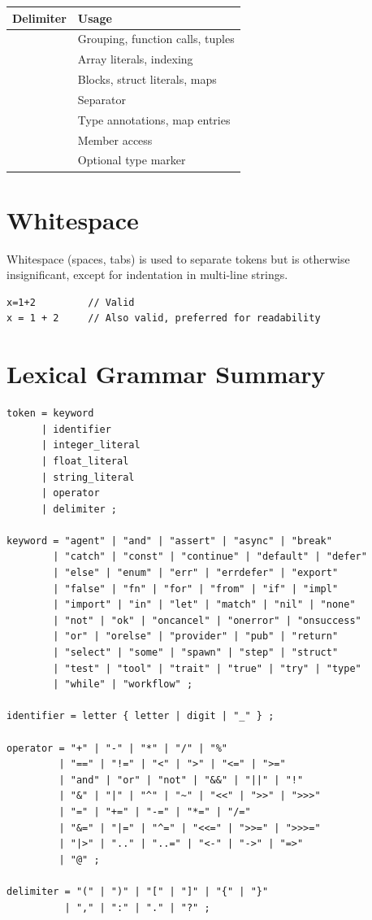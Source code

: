 \begin{table}[h]
\centering
\begin{tabular}{ll}
\toprule
\textbf{Delimiter} & \textbf{Usage} \\
\midrule
\code{(} \code{)} & Grouping, function calls, tuples \\
\code{[} \code{]} & Array literals, indexing \\
\code{\{} \code{\}} & Blocks, struct literals, maps \\
\code{,} & Separator \\
\code{:} & Type annotations, map entries \\
\code{.} & Member access \\
\code{?} & Optional type marker \\
\bottomrule
\end{tabular}
\end{table}

\section{Whitespace}

Whitespace (spaces, tabs) is used to separate tokens but is otherwise insignificant, except for indentation in multi-line strings.

\begin{lstlisting}
x=1+2         // Valid
x = 1 + 2     // Also valid, preferred for readability
\end{lstlisting}

\section{Lexical Grammar Summary}

\begin{lstlisting}[language=EBNF]
token = keyword
      | identifier
      | integer_literal
      | float_literal
      | string_literal
      | operator
      | delimiter ;

keyword = "agent" | "and" | "assert" | "async" | "break"
        | "catch" | "const" | "continue" | "default" | "defer"
        | "else" | "enum" | "err" | "errdefer" | "export"
        | "false" | "fn" | "for" | "from" | "if" | "impl"
        | "import" | "in" | "let" | "match" | "nil" | "none"
        | "not" | "ok" | "oncancel" | "onerror" | "onsuccess"
        | "or" | "orelse" | "provider" | "pub" | "return"
        | "select" | "some" | "spawn" | "step" | "struct"
        | "test" | "tool" | "trait" | "true" | "try" | "type"
        | "while" | "workflow" ;

identifier = letter { letter | digit | "_" } ;

operator = "+" | "-" | "*" | "/" | "%"
         | "==" | "!=" | "<" | ">" | "<=" | ">="
         | "and" | "or" | "not" | "&&" | "||" | "!"
         | "&" | "|" | "^" | "~" | "<<" | ">>" | ">>>"
         | "=" | "+=" | "-=" | "*=" | "/="
         | "&=" | "|=" | "^=" | "<<=" | ">>=" | ">>>="
         | "|>" | ".." | "..=" | "<-" | "->" | "=>"
         | "@" ;

delimiter = "(" | ")" | "[" | "]" | "{" | "}"
          | "," | ":" | "." | "?" ;
\end{lstlisting}
